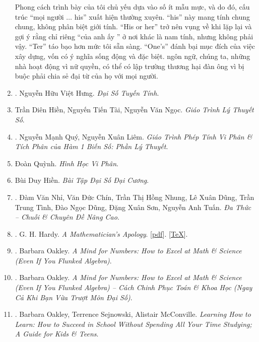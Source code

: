 \documentclass{article}
\begin{document}
\begin{enumerate}
	Phong cách trình bày của tôi chủ yếu dựa vào số ít mẫu mực, và do đó, cấu trúc ``mọi người $\ldots$ his'' xuất hiện thường xuyên. ``his'' này mang tính chung chung, không phân biệt giới tính. ``His or her'' trở nên vụng về khi lặp lại và gợi ý rằng chỉ riêng ``của anh ấy '' ở nơi khác là nam tính, nhưng không phải vậy. ``Ter'' táo bạo hơn mức tôi sẵn sàng. ``One's'' đánh bại mục đích của việc xây dựng, vốn có ý nghĩa sống động và đặc biệt. ngôn ngữ, chúng ta, những nhà hoạt động vì nữ quyền, có thể có lập trường thương hại đàn ông vì bị buộc phải chia sẻ đại từ của họ với mọi người.
	
	\item \cite{Hung_linear_algebra}. {\sc Nguyễn Hữu Việt Hưng}. {\it Đại Số Tuyến Tính}.\hfill{\sf[reading]}
	\item Trần Diên Hiền, Nguyến Tiến Tài, Nguyễn Văn Ngọc. {\it Giáo Trình Lý Thuyết Số}.
	\item \cite{Quy_Liem2012}. Nguyễn Mạnh Quý, Nguyễn Xuân Liêm. {\it Giáo Trình Phép Tính Vi Phân \& Tích Phân của Hàm 1 Biến Số: Phần Lý Thuyết}.\hfill{\sf[reading]}
	\item Đoàn Quỳnh. {\it Hình Học Vi Phân}.
	\item Bùi Duy Hiền. {\it Bài Tập Đại Số Đại Cương}.
	\item \cite{Nhi_Chin_Dung_Dung_Tinh_Dung_Son_Tuan2017}. Đàm Văn Nhỉ, Văn Đức Chín, Trần Thị Hồng Nhung, Lê Xuân Dũng, Trần Trung Tình, Đào Ngọc Dũng, Đặng Xuân Sơn, Nguyễn Anh Tuấn. {\it Đa Thức -- Chuỗi \& Chuyên Đề Nâng Cao}.
	\item \cite{Hardy1940, Hardy1992, Hardy2022}. G. H. Hardy. {\it A Mathematician's Apology}. [\href{https://github.com/NQBH/hobby/blob/master/advanced_mathematics/Hardy2017/NQBH_Hardy2017.pdf}{pdf}]. [\href{https://github.com/NQBH/hobby/blob/master/advanced_mathematics/Hardy2017/NQBH_Hardy2017.tex}{\TeX}].\hfill{\sf[done]}
	\item \cite{Oakley2014}. Barbara Oakley. {\it A Mind for Numbers: How to Excel at Math \& Science (Even If You Flunked Algebra)}.\hfill{\sf[reading]}
	\item \cite{Oakley_mind_number}. Barbara Oakley. {\it A Mind for Numbers: How to Excel at Math \& Science (Even If You Flunked Algebra) -- Cách Chinh Phục Toán \& Khoa Học (Ngay Cả Khi Bạn Vừa Trượt Môn Đại Số)}.\hfill{\sf[done]}
	\item \cite{Oakley_Sejnowski_McConville_learn_how_learn}. Barbara Oakley, Terrence Sejnowski, Alistair McConville. {\it Learning How to Learn: How to Succeed in School Without Spending All Your Time Studying; A Guide for Kids \& Teens}.\hfill{\sf[reading]}

\end{enumerate}
\end{document}
